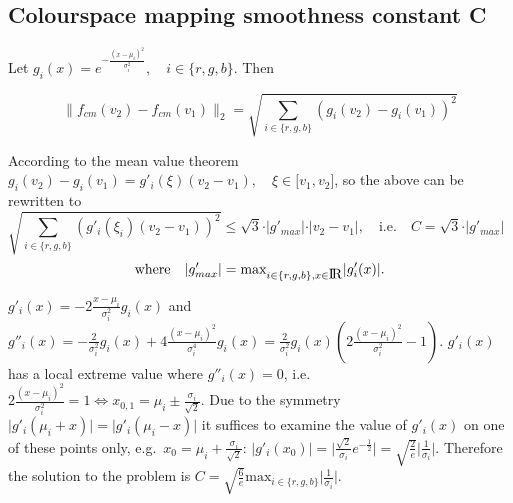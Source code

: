 \documentclass[11pt]{article}
\begin{document}
\begin{appendix}

\section{Colourspace mapping smoothness constant C}
\label{CalculateC}

Let $g_i(x) = e^{-\frac{(x - \mu_i)^2}{\sigma_i^2}}, \quad i \in \{r,g,b\}$. Then

$$\| f_{cm}(v_2) - f_{cm}(v_1) \|_2 = \sqrt{\sum\limits_{i \in \{r,g,b\}} (g_i(v_2) - g_i(v_1))^2}$$

According to the mean value theorem $g_i(v_2) - g_i(v_1) = g'_i(\xi) (v_2 - v_1), \quad
\xi \in \lbrack v_1, v_2 \rbrack$, so the above can be rewritten to
$$\sqrt{\sum\limits_{i \in\{r,g,b\}} (g'_i(\xi_i)(v_2 - v_1))^2} \le 
\sqrt{3} \cdot \vert g'_{max} \vert \cdot \vert v_2 - v_1 \vert, \quad
\mbox{i.e.} \quad C = \sqrt{3} \cdot \vert g'_{max} \vert \quad$$
$$\mbox{where} \quad \vert g'_{max} \vert = \mbox{max}_{i \in \{r,g,b\}, x \in \mbox{I}\!\mbox{R}} \vert g'_i(x) \vert.$$

$g'_i(x) = -2\frac{x - \mu_i}{\sigma_i^2} g_i(x)$ and
$g''_i(x) = -\frac{2}{\sigma_i^2} g_i(x) + 4\frac{(x - \mu_i)^2}{\sigma_i^4}g_i(x) =
\frac{2}{\sigma_i^2} g_i(x) (2\frac{(x - \mu_i)^2}{\sigma_i^2} - 1)$. $g'_i(x)$ has
a local extreme value where $g''_i(x) = 0$,
i.e.\ $2\frac{(x - \mu_i)^2}{\sigma_i^2} = 1 \Longleftrightarrow x_{0,1} = \mu_i \pm \frac{\sigma_i}{\sqrt{2}}.$
Due to the symmetry $\vert g'_i(\mu_i + x) \vert = \vert g'_i(\mu_i - x) \vert$ it suffices to
examine the value of $g'_i(x)$ on one of these points only, e.g.\ $x_0 = \mu_i + \frac{\sigma_i}{\sqrt{2}}$:
$\vert g'_i(x_0) \vert = \vert \frac{\sqrt{2}}{\sigma_i} e^{-\frac{1}{2}} \vert =
\sqrt{\frac{2}{e}} \vert \frac{1}{\sigma_i} \vert$. Therefore the solution to the problem is
$C = \sqrt{\frac{6}{e}} \mbox{max}_{i \in \{r,g,b\}} \vert \frac{1}{\sigma_i} \vert$.

\end{appendix}
\end{document}
